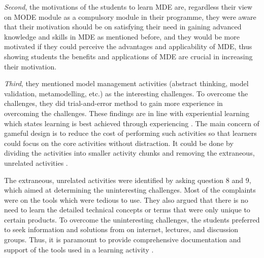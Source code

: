 \documentclass[12pt, a4paper]{report}
\begin{document}
{\textit{Second}, the motivations of the students to learn MDE are, regardless their view on MODE module as a compulsory module in their programme, they were aware that their motivation should be on satisfying their need in gaining advanced knowledge and skills in MDE as mentioned before, and they would be more motivated if they could perceive the advantages and applicability of MDE, thus showing students the benefits and applications of MDE are crucial in increasing their motivation.

\textit{Third}, they mentioned model management activities (abstract thinking, model validation, metamodelling, etc.) as the interesting challenges. To overcome the challenges, they did trial-and-error method to gain more experience in overcoming the challenges. These findings are in line with experiential learning which states learning is best achieved through experiencing \cite{kolb2014experiential}. The main concern of gameful design is to reduce the cost of performing such activities so that learners could focus on the core activities without distraction. It could be done by dividing the activities into smaller activity chunks and removing the extraneous, unrelated activities \cite{deterding2015lens}. 

The extraneous, unrelated activities were identified by asking question 8 and 9, which aimed at determining the uninteresting challenges. Most of the complaints were on the tools which were tedious to use. They also argued that there is no need to learn the detailed technical concepts or terms that were only unique to certain products. To overcome the uninteresting challenges, the students preferred to seek information and solutions from on internet, lectures, and discussion groups. Thus, it is paramount to provide comprehensive documentation and support of the tools used in a learning activity \cite{liebel2015ready}. 

}
\end{document}
